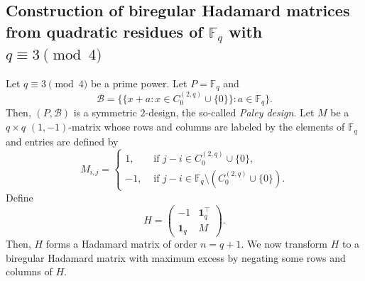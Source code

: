 \documentclass[ALCO,ThmDefs,Unicode]{cedram}
\newcommand*\F{{\mathbb F}}
\newcommand*\tra{\top}
\newcommand*{\un}{\mathbf{1}}
\begin{document}
\subsection{Construction of biregular Hadamard matrices from quadratic residues of \texorpdfstring{$\F_q$}{Fq} with \texorpdfstring{$q\equiv 3\pmod{4}$}{q = 3 (mod 4)}}\label{sec:4.1}

Let $q\equiv 3\pmod{4}$ be a prime power. Let $P=\F_q$ and
\begin{equation}\label{eq:desquad}
{\mathcal B}=\{\{x+a:x \in C_0^{(2,q)}\cup \{0\}\}:a \in \F_q\}.
\end{equation}
Then, $(P,{\mathcal B})$ is a symmetric $2$-design, the so-called \emph{Paley design}. Let $M$ be a $q\times q$ $(1,-1)$-matrix whose rows and columns are labeled by the elements of $\F_q$ and entries are defined by
\[
M_{i,j}=
\begin{cases}
1,& \text{ if } j-i\in C_0^{(2,q)} \cup \{0\},\\
-1,& \text{ if } j-i\in \F_q\setminus (C_0^{(2,q)} \cup \{0\}).
\end{cases}
\]
Define
\begin{equation}\label{eq:conf}
H=
\begin{pmatrix} -1 & \un_q^\tra \\ \un_q & M
\end{pmatrix}.
\end{equation}
Then, $H$ forms a Hadamard matrix of order $n=q+1$. We now transform $H$ to a biregular Hadamard matrix with maximum excess by negating some rows and columns of $H$.
\end{document}
